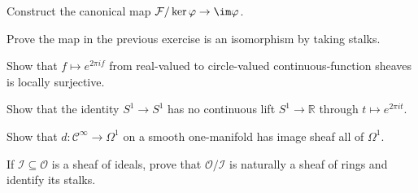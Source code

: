 \begin{exercise}[Coimage]\label{ex:vi15-21}
Construct the canonical map $\mathcal F/\ker\varphi\to\im\varphi$.
\end{exercise}

\begin{exercise}\label{ex:vi15-22}
Prove the map in the previous exercise is an isomorphism by taking stalks.
\end{exercise}

\begin{exercise}\label{ex:vi15-23}
Show that $f\mapsto e^{2\pi i f}$ from real-valued to circle-valued continuous-function sheaves is locally surjective.
\end{exercise}

\begin{exercise}\label{ex:vi15-24}
Show that the identity $S^1\to S^1$ has no continuous lift $S^1\to\mathbb R$ through $t\mapsto e^{2\pi i t}$.
\end{exercise}

\begin{exercise}\label{ex:vi15-25}
Show that $d:\mathcal C^\infty\to\Omega^1$ on a smooth one-manifold has image sheaf all of $\Omega^1$.
\end{exercise}

\begin{exercise}\label{ex:vi15-26}
If $\mathcal I\subseteq\mathcal O$ is a sheaf of ideals, prove that $\mathcal O/\mathcal I$ is naturally a sheaf of rings and identify its stalks.
\end{exercise}
